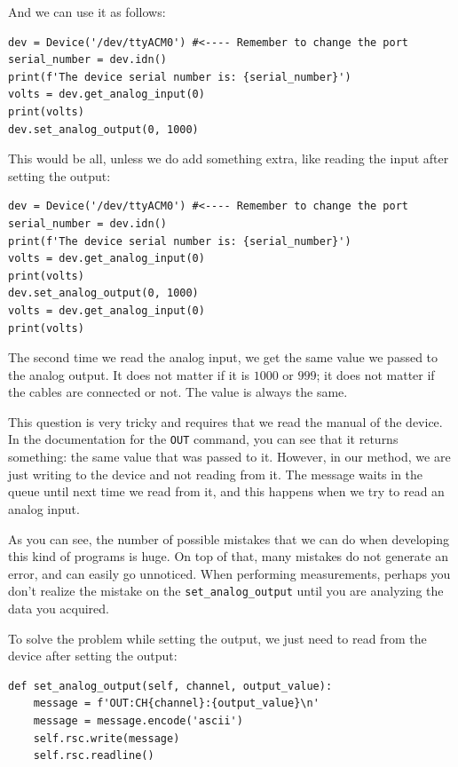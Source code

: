 And we can use it as follows:

\begin{verbatim}
dev = Device('/dev/ttyACM0') #<---- Remember to change the port
serial_number = dev.idn()
print(f'The device serial number is: {serial_number}')
volts = dev.get_analog_input(0)
print(volts)
dev.set_analog_output(0, 1000)
\end{verbatim}

This would be all, unless we do add something extra, like reading the input after setting the output:

\begin{verbatim}
dev = Device('/dev/ttyACM0') #<---- Remember to change the port
serial_number = dev.idn()
print(f'The device serial number is: {serial_number}')
volts = dev.get_analog_input(0)
print(volts)
dev.set_analog_output(0, 1000)
volts = dev.get_analog_input(0)
print(volts)
\end{verbatim}

The second time we read the analog input, we get the same value we passed to the analog output. It does not matter if it is $1000$ or $999$; it does not matter if the cables are connected or not. The value is always the same.


This question is very tricky and requires that we read the manual of the device. In the documentation for the \texttt{OUT} command, you can see that it returns something: the same value that was passed to it. However, in our method, we are just writing to the device and not reading from it. The message waits in the queue until next time we read from it, and this happens when we try to read an analog input.

As you can see, the number of possible mistakes that we can do when developing this kind of programs is huge. On top of that, many mistakes do not generate an error, and can easily go unnoticed. When performing measurements, perhaps you don't realize the mistake on the \texttt{set\_analog\_output} until you are analyzing the data you acquired.

To solve the problem while setting the output, we just need to read from the device after setting the output:

\begin{verbatim}
def set_analog_output(self, channel, output_value):
    message = f'OUT:CH{channel}:{output_value}\n'
    message = message.encode('ascii')
    self.rsc.write(message)
    self.rsc.readline()
\end{verbatim}

